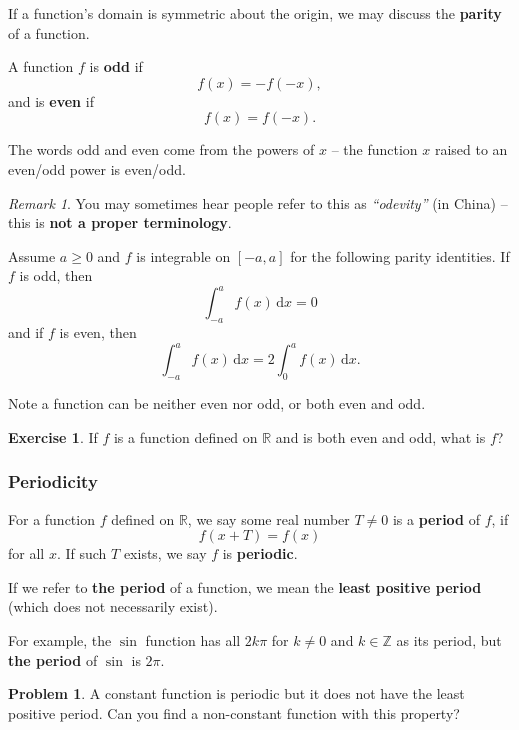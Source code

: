 \documentclass[11pt]{article}
\theoremstyle{definition}
\newtheorem{example}[theorem]{Exercise}
\newtheorem{problem}[theorem]{Problem}
\theoremstyle{remark}
\newtheorem{remark}[theorem]{Remark}
\newcommand{\pqty}[1]{\left(#1\right)}
\newcommand{\ZZ}{\mathbb{Z}}
\newcommand{\RR}{\mathbb{R}}
\newcommand{\dd}[1]{\,\mathrm{d}#1}
\begin{document}
If a function's domain is symmetric about the origin, we may discuss the \textbf{parity} of a function.

A function \(f\) is \textbf{odd} if
\[
    f\pqty{x} = - f\pqty{-x},
\]
and is \textbf{even} if
\[
    f\pqty{x} = f\pqty{-x}.
\]

The words odd and even come from the powers of \(x\) -- the function \(x\) raised to an even/odd power is even/odd.

\begin{remark}\label{tmua-5-unit-005}
    You may sometimes hear people refer to this as \textit{``odevity''} (in China) -- this is \textbf{not a proper terminology}.
\end{remark}

Assume \(a\ge0\) and \(f\) is integrable on \([-a,a]\) for the following parity identities. If \(f\) is odd, then
\[
    \int_{-a}^{a} f\pqty{x} \dd{x} = 0
\]
and if \(f\) is even, then
\[
    \int_{-a}^{a} f\pqty{x} \dd{x} = 2 \int_{0}^{a} f\pqty{x} \dd{x}.
\]

Note a function can be neither even nor odd, or both even and odd.

\begin{example}\label{tmua-5-unit-006}
    If \(f\) is a function defined on \(\RR\) and is both even and odd, what is \(f\)?
\end{example}

\subsubsection{Periodicity}\label{tmua-5-subsubsection-003}

For a function \(f\) defined on \(\RR\), we say some real number \(T \neq 0\) is a \textbf{period} of \(f\), if
\[
    f \pqty{x + T} = f \pqty{x}
\]
for all \(x\). If such \(T\) exists, we say \(f\) is \textbf{periodic}.

If we refer to \textbf{the period} of a function, we mean the \textbf{least positive period} (which does not necessarily exist).

For example, the \(\sin\) function has all \(2 k \pi\) for \(k \neq 0\) and \(k \in \ZZ\) as its period, but \textbf{the period} of \(\sin\) is \(2 \pi\).

\begin{problem}\label{tmua-5-unit-007}
    A constant function is periodic but it does not have the least positive period. Can you find a non-constant function with this property?
\end{problem}
\end{document}

